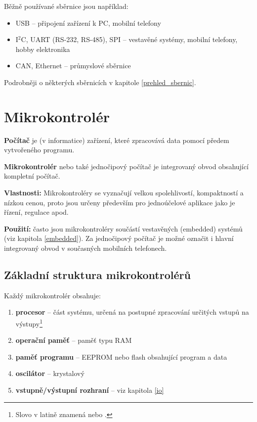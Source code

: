 \documentclass[12pt]{article}
\begin{document}
 \vspace{0.5\baselineskip} %
Běžně používané sběrnice jsou například:

\begin{itemize}
	\item USB -- připojení zařízení k PC, mobilní telefony 
	\item I$^{2}$C, UART (RS-232, RS-485), SPI -- vestavěné systémy, mobilní telefony, hobby elektronika 
	\item  CAN, Ethernet -- průmyslové sběrnice %
\end{itemize}

Podrobněji o některých sběrnicích v kapitole \ref{prehled_sbernic}.


\section{Mikrokontrolér} \label{mc_section}

\textbf{Počítač} je (v informatice) zařízení, které zpracovává data pomocí předem vytvořeného \hypertarget{mc}{programu}. 

\textbf{Mikrokontrolér} nebo také jednočipový počítač
 je integrovaný obvod obsahující kompletní počítač. 

\textbf{Vlastnosti:} Mikrokontroléry se vyznačují velkou spolehlivostí, kompaktností a nízkou cenou, proto jsou určeny především pro jednoúčelové
aplikace jako je řízení, regulace apod. 

\textbf{ Použití:} často jsou mikrokontroléry součástí vestavěných (embedded) systémů (viz kapitola \ref{embedded}). 
Za jed\-no\-či\-po\-vý počítač je možné označit i hlavní integrovaný obvod v současných mobilních telefonech. 

\subsection{Základní struktura mikrokontrolérů}

Každý mikrokontrolér obsahuje: 
\begin{enumerate}
	\item \textbf{procesor} -- část systému, určená na postupné zpracování určitých vstupů na výstupy\footnote{Slovo  v latině znamená  nebo .}
	\item \textbf{operační paměť} -- paměť typu RAM  
	\item \textbf{paměť programu} -- EEPROM nebo flash obsahující program a data
	\item \textbf{oscilátor} -- krystalový 
	\item \textbf{vstupně/výstupní rozhraní} -- viz kapitola \ref{io}
\end{enumerate}
\end{document}
